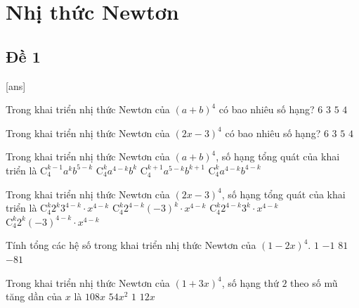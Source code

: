 \section{Nhị thức Newtơn}

\subsection{Đề 1}
[ans]
\caulc
\begin{ex}%
	Trong khai triển nhị thức Newtơn của $(a+b)^4$ có bao nhiêu số hạng?
	\choice
	{$6$}
	{$3$}
	{\True $5$}
	{$4$}
\end{ex}
\begin{ex}%
	Trong khai triển nhị thức Newtơn của $(2x-3)^4$ có bao nhiêu số hạng?
	\choice
	{$6$}
	{$3$}
	{\True $5$}
	{$4$}
\end{ex}
\begin{ex}%
	Trong khai triển nhị thức Newtơn của $(a+b)^4$, số hạng tổng quát của khai triển là
	\choice
	{$\mathrm{C}_4^{k-1}a^kb^{5-k}$}
	{\True $\mathrm{C}_4^ka^{4-k}b^k$}
	{$\mathrm{C}_4^{k+1}a^{5-k}b^{k+1}$}
	{$\mathrm{C}_4^ka^{4-k}b^{4-k}$}
\end{ex}
\begin{ex}%
	Trong khai triển nhị thức Newtơn của $(2x-3)^4$, số hạng tổng quát của khai triển là
	\choice
	{$\mathrm{C}_4^k2^k3^{4-k}\cdot x^{4-k}$}
	{\True $\mathrm{C}_4^k2^{4-k}(-3)^k\cdot x^{4-k}$}
	{$\mathrm{C}_4^k2^{4-k}3^k\cdot x^{4-k}$}
	{$\mathrm{C}_4^k2^k\left(-3\right)^{4-k}\cdot x^{4-k}$}
\end{ex}
\begin{ex}%
	Tính tổng các hệ số trong khai triển nhị thức Newtơn của $(1-2x)^4$.
	\choice
	{\True $1$}
	{$-1$}
	{$81$}
	{$-81$}
\end{ex}
\begin{ex}%
	Trong khai triển nhị thức Newtơn của $(1+3x)^4$, số hạng thứ $2$ theo số mũ tăng dần của $x$ là
	\choice
	{$108x$}
	{$54x^2$}
	{$1$}
	{\True $12x$}
\end{ex}
